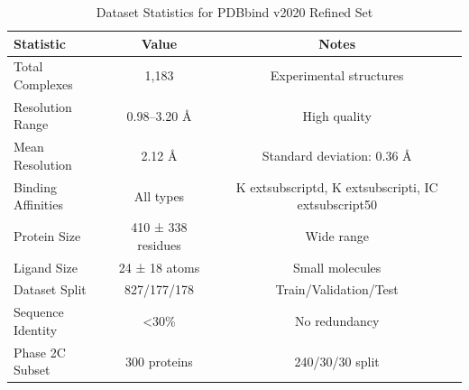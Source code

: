 
\begin{table}[h]
\centering
\caption{Dataset Statistics for PDBbind v2020 Refined Set}
\label{tab:dataset}
\begin{tabular}{lcc}
\toprule
\textbf{Statistic} & \textbf{Value} & \textbf{Notes} \\
\midrule
Total Complexes & 1,183 & Experimental structures \\
Resolution Range & 0.98--3.20 \AA & High quality \\
Mean Resolution & 2.12 \AA & Standard deviation: 0.36 \AA \\
Binding Affinities & All types & K	extsubscript{d}, K	extsubscript{i}, IC	extsubscript{50} \\
Protein Size & 410 ± 338 residues & Wide range \\
Ligand Size & 24 ± 18 atoms & Small molecules \\
Dataset Split & 827/177/178 & Train/Validation/Test \\
Sequence Identity & <30\% & No redundancy \\
Phase 2C Subset & 300 proteins & 240/30/30 split \\
\bottomrule
\end{tabular}
\end{table}
